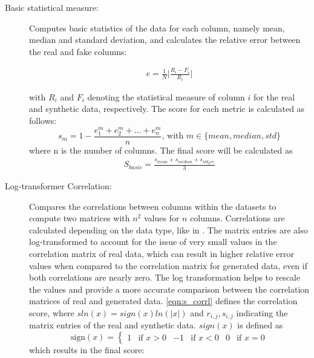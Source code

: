 \begin{description}
  \item[Basic statistical measure:]
  Computes basic statistics of the data for each column, namely mean, median and standard deviation, and calculates the relative error between the real and fake columns:
  
  \begin{equation}
    \begin{align*}
      \label{eqn:rel_err}
      e=\frac{1}{N} \bigg| \frac{R_i-F_i}{R_i} \bigg| 
      \end{align*}
  \end{equation}

  with $R_i$ and $F_i$ denoting the statistical measure of column $i$ for the real and synthetic data, respectively.
  The score for each metric is calculated as follows:
  $$s_m = 1-\frac{e^m_1+e^m_2+...+e^m_n}{n} \textrm{, with }m \in \{mean, median, std\}$$
  where n is the number of columns.
  The final score will be calculated as
  \begin{equation}
    \begin{align*}
      \label{eqn:s_basic}
      S_{basic} = \frac{s_{mean}+s_{median}+s_{std_dev}}{3}
      \end{align*}
  \end{equation}


  \item[Log-transformer Correlation:]
  Compares the correlations between columns within the datasets to compute two matrices with $n^2$ values for $n$ columns.
  Correlations are calculated depending on the data type, like in \cite{brenninkmeijer2019GenerationEvaluationTabular}.
  The matrix entries are also log-transformed to account for the issue of very small values in the correlation matrix of real data, which can result in higher relative error values when compared to the correlation matrix for generated data, even if both correlations are nearly zero. 
  The log transformation helps to rescale the values and provide a more accurate comparison between the correlation matrices of real and generated data.
  \autoref{eqn:s_corrl} defines the correlation score, where $sln(x) = sign(x)ln(|x|)$ and $r_{i,j}, s_{i,j}$ indicating the matrix entries of the real and synthetic data.
  $sign(x)$ is defined as
  $$\textrm{sign}(x) = \begin{cases}1 & \text{if } x > 0 & -1 & \text{if } x < 0 & 0 & \text{if } x = 0\end{cases}$$
  which results in the final score:
  

\end{description}
